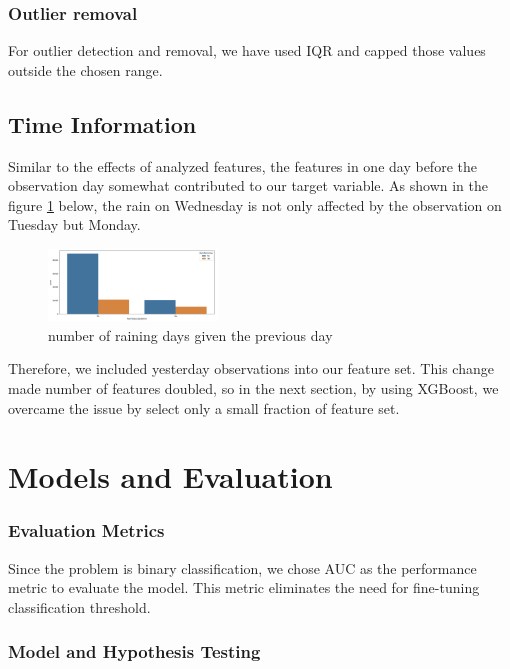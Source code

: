 \documentclass{article}
\begin{document}
\subsubsection{Outlier removal}

For outlier detection and removal, we have used IQR and capped those values outside the chosen range.

\subsection{Time Information}

Similar to the effects of analyzed features, the features in one day before the observation day somewhat contributed to our target variable. As shown in the figure \ref{fig:rainyesterday} below, the rain on Wednesday is not only affected by the observation on Tuesday but Monday.

\begin{figure}[h!]
\centering
\includegraphics[width=0.4\textwidth]{rainyesterday.png}
\caption{number of raining days given the previous day}
\label{fig:rainyesterday}
\end{figure}

Therefore, we included yesterday observations into our feature set. This change made number of features doubled, so in the next section, by using XGBoost, we overcame the issue by select only a small fraction of feature set. 

\section{Models and Evaluation}

\subsubsection{Evaluation Metrics}

Since the problem is binary classification, we chose AUC as the performance metric to evaluate the model. This metric eliminates the need for fine-tuning classification threshold.

\subsubsection{Model and Hypothesis Testing}
\end{document}
